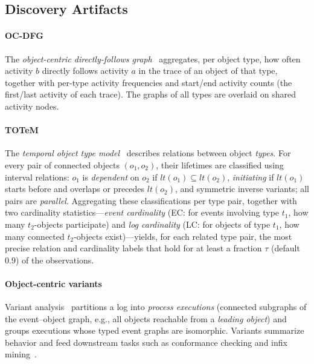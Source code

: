 \documentclass[sigconf, nonacm]{acmart}
\begin{document}
\subsection{Discovery Artifacts}
\label{sec:artifacts}

\paragraph{OC-DFG}
The \emph{object-centric directly-follows graph}~\cite{berti2023ocpm} aggregates, per object type, how often activity $b$ directly follows activity $a$ in the trace of an object of that type, together with per-type activity frequencies and start/end activity counts (the first/last activity of each trace). The graphs of all types are overlaid on shared activity nodes.

\paragraph{TOTeM}
The \emph{temporal object type model}~\cite{liss2024totem} describes relations between object \emph{types}. For every pair of connected objects $(o_1,o_2)$, their lifetimes are classified using interval relations: $o_1$ is \emph{dependent} on $o_2$ if $\mathit{lt}(o_1) \subseteq \mathit{lt}(o_2)$, \emph{initiating} if $\mathit{lt}(o_1)$ starts before and overlaps or precedes $\mathit{lt}(o_2)$, and symmetric inverse variants; all pairs are \emph{parallel}. Aggregating these classifications per type pair, together with two cardinality statistics---\emph{event cardinality} (EC: for events involving type $t_1$, how many $t_2$-objects participate) and \emph{log cardinality} (LC: for objects of type $t_1$, how many connected $t_2$-objects exist)---yields, for each related type pair, the most precise relation and cardinality labels that hold for at least a fraction $\tau$ (default $0.9$) of the observations.

\paragraph{Object-centric variants}
Variant analysis~\cite{adams2022variants} partitions a log into \emph{process executions} (connected subgraphs of the event--object graph, e.g., all objects reachable from a \emph{leading object}) and groups executions whose typed event graphs are isomorphic. Variants summarize behavior and feed downstream tasks such as conformance checking and infix mining~\cite{martini2023infix}.
\end{document}
